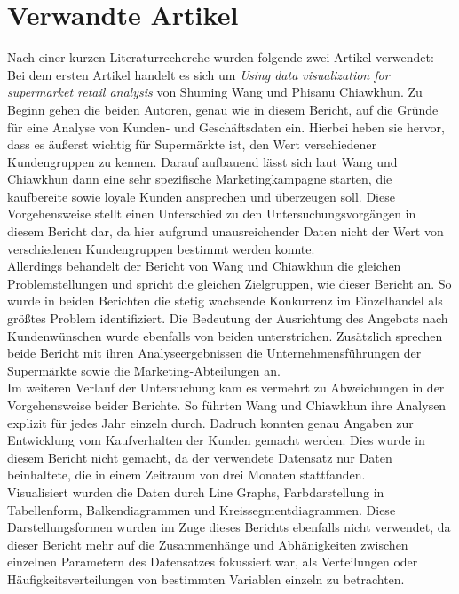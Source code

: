 \documentclass[usegeometry=true]{scrartcl}
\begin{document}
\section{Verwandte Artikel}
Nach einer kurzen Literaturrecherche wurden folgende zwei Artikel verwendet:\\

\noindent Bei dem ersten Artikel handelt es sich um \textit{Using data visualization for supermarket retail analysis} von Shuming Wang und Phisanu Chiawkhun. \cite{wang2022data}
Zu Beginn gehen die beiden Autoren, genau wie in diesem Bericht, auf die Gründe für eine Analyse von Kunden- und Geschäftsdaten ein. Hierbei heben sie hervor, dass es äußerst
wichtig für Supermärkte ist, den Wert verschiedener Kundengruppen zu kennen. Darauf aufbauend lässt sich laut Wang und Chiawkhun dann eine sehr spezifische Marketingkampagne
starten, die kaufbereite sowie loyale Kunden ansprechen und überzeugen soll. Diese Vorgehensweise stellt einen Unterschied zu den Untersuchungsvorgängen in diesem Bericht dar,
da hier aufgrund unausreichender Daten nicht der Wert von verschiedenen Kundengruppen bestimmt werden konnte.\\
Allerdings behandelt der Bericht von Wang und Chiawkhun die gleichen Problemstellungen und spricht die gleichen Zielgruppen, wie dieser Bericht an. So wurde in beiden Berichten
die stetig wachsende Konkurrenz im Einzelhandel als größtes Problem identifiziert. Die Bedeutung der Ausrichtung des Angebots nach Kundenwünschen wurde ebenfalls von beiden
unterstrichen. Zusätzlich sprechen beide Bericht mit ihren Analyseergebnissen die Unternehmensführungen der Supermärkte sowie die Marketing-Abteilungen an.\\
Im weiteren Verlauf der Untersuchung kam es vermehrt zu Abweichungen in der Vorgehensweise beider Berichte. So führten Wang und Chiawkhun ihre Analysen explizit für
jedes Jahr einzeln durch. Dadruch konnten genau Angaben zur Entwicklung vom Kaufverhalten der Kunden gemacht werden. Dies wurde in diesem Bericht nicht gemacht, da der
verwendete Datensatz nur Daten beinhaltete, die in einem Zeitraum von drei Monaten stattfanden.\\
Visualisiert wurden die Daten durch Line Graphs, Farbdarstellung in Tabellenform, Balkendiagrammen und Kreissegmentdiagrammen. Diese Darstellungsformen wurden im Zuge dieses
Berichts ebenfalls nicht verwendet, da dieser Bericht mehr auf die Zusammenhänge und Abhänigkeiten zwischen einzelnen Parametern des Datensatzes fokussiert war, als Verteilungen
oder Häufigkeitsverteilungen von bestimmten Variablen einzeln zu betrachten.\\
\end{document}
